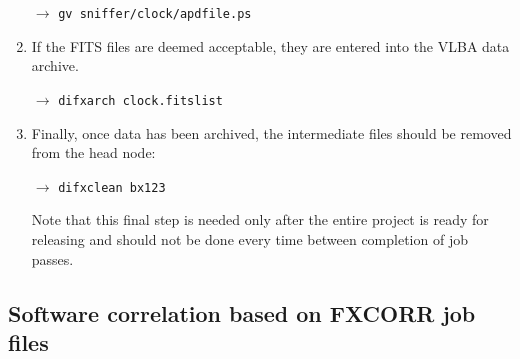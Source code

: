 \begin{enumerate}
$\longrightarrow$ {\tt gv sniffer/clock/apdfile.ps}

\item
If the FITS files are deemed acceptable, they are entered into the VLBA data archive.

$\longrightarrow$ {\tt difxarch clock.fitslist}

\item
Finally, once data has been archived, the intermediate files should be removed from the head node:

$\longrightarrow$ {\tt difxclean bx123}

Note that this final step is needed only after the entire project is ready for releasing and should not be done every time between completion of job passes.

\end{enumerate}



\subsection{Software correlation based on FXCORR job files}

